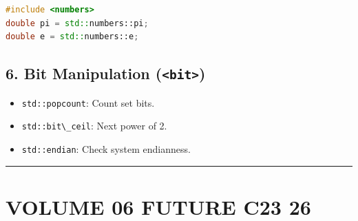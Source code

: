 \begin{lstlisting}[language={C++}]
#include <numbers>
double pi = std::numbers::pi;
double e = std::numbers::e;
\end{lstlisting}

\hypertarget{bit-manipulation-bit}{%
\section{\texorpdfstring{6. Bit Manipulation
(\texttt{\textless{}bit\textgreater{}})}{6. Bit Manipulation (\textless bit\textgreater)}}\label{bit-manipulation-bit}}

\begin{itemize}
\tightlist
\item
  \passthrough{\lstinline!std::popcount!}: Count set bits.
\item
  \passthrough{\lstinline!std::bit\_ceil!}: Next power of 2.
\item
  \passthrough{\lstinline!std::endian!}: Check system endianness.
\end{itemize}

\begin{center}\rule{0.5\linewidth}{0.5pt}\end{center}

\hypertarget{volume-06-future-c23-26}{%
\chapter{VOLUME 06 FUTURE C23 26}\label{volume-06-future-c23-26}}
